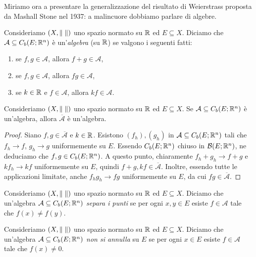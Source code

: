 Miriamo ora a presentare la generalizzazione del risultato di Weierstrass proposta da Mashall Stone nel 1937: a malincuore dobbiamo parlare di algebre.
\begin{definizione}
Consideriamo $(X,\lVert\;\rVert)$ uno spazio normato su $\mathbb{R}$ ed $E \subseteq X$. Diciamo che $\mathcal{A} \subseteq C_b(E; \mathbb{R}^n)$ è un'\emph{algebra} (su $\mathbb{R}$) se valgono i seguenti fatti:
\begin{enumerate}[$(a)$]
\item se $f,g \in \mathcal{A}$, allora $f+g \in \mathcal{A}$,
\item se $f,g \in \mathcal{A}$, allora $fg \in \mathcal{A}$,
\item se $k \in \mathbb{R}$ e $f \in \mathcal{A}$, allora $kf \in \mathcal{A}$.
\end{enumerate}
\end{definizione}

\begin{lemma}
Consideriamo $(X,\lVert\;\rVert)$ uno spazio normato su $\mathbb{R}$ ed $E \subseteq X$. Se $\mathcal{A} \subseteq C_b(E; \mathbb{R}^n)$ è un'algebra, allora $\overline{\mathcal{A}}$ è un'algebra.
\end{lemma}
\begin{proof}
Siano $f,g \in \overline{\mathcal{A}}$ e $k \in \mathbb{R}$. Esistono $(f_h),(g_h)$ in $\mathcal{A} \subseteq C_b(E; \mathbb{R}^n)$ tali che $f_h \to f$, $g_h \to g$ uniformemente su $E$. Essendo $C_b(E;\mathbb{R}^n)$ chiuso in $\mathcal{B}(E;\mathbb{R}^n)$, ne deduciamo che $f,g \in C_b(E; \mathbb{R}^n)$. A questo punto, chiaramente $f_h + g_h \to f+g$ e $kf_h \to kf$ uniformemente su $E$, quindi $f+g, kf \in \overline{\mathcal{A}}$. Inoltre, essendo tutte le applicazioni limitate, anche $f_hg_h \to fg$ uniformemente su $E$, da cui $fg \in \overline{\mathcal{A}}$.
\end{proof}

\begin{definizione}
Consideriamo $(X,\lVert\;\rVert)$ uno spazio normato su $\mathbb{R}$ ed $E \subseteq X$. Diciamo che un'algebra $\mathcal{A} \subseteq C_b(E; \mathbb{R}^n)$ \emph{separa i punti} se per ogni $x,y \in E$ esiste $f \in \mathcal{A}$ tale che $f(x) \ne f(y)$.
\end{definizione}

\begin{definizione}
Consideriamo $(X,\lVert\;\rVert)$ uno spazio normato su $\mathbb{R}$ ed $E \subseteq X$. Diciamo che un'algebra $\mathcal{A} \subseteq C_b(E; \mathbb{R}^n)$ \emph{non si annulla} su $E$ se per ogni $x \in E$ esiste $f \in \mathcal{A}$ tale che $f(x) \ne 0$.
\end{definizione}

